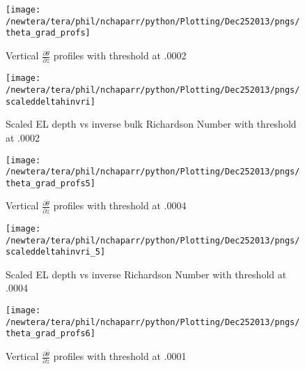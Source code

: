 \begin{figure}[htbp]
    \centering
    \texttt{[image: /newtera/tera/phil/nchaparr/python/Plotting/Dec252013/pngs/theta\_grad\_profs]}
    \caption{Vertical $\frac{\partial \overline{\theta}}{\partial z}$ profiles with threshold at .0002}
    \label{fig:thresh}   %
\end{figure}

\begin{figure}[htbp]
\centering
 \texttt{[image: /newtera/tera/phil/nchaparr/python/Plotting/Dec252013/pngs/scaleddeltahinvri]}
       
        \caption{Scaled EL depth vs inverse bulk Richardson Number with threshold at .0002}
         \label{fig:scaledeltahinvri}
\end{figure}

\begin{figure}[htbp]
    \centering
    \texttt{[image: /newtera/tera/phil/nchaparr/python/Plotting/Dec252013/pngs/theta\_grad\_profs5]}
    \caption{Vertical $\frac{\partial \overline{\theta}}{\partial z}$ profiles with threshold at .0004}
    \label{fig:thresh1}   %
\end{figure}

\begin{figure}[htbp]
    \centering
    \texttt{[image: /newtera/tera/phil/nchaparr/python/Plotting/Dec252013/pngs/scaleddeltahinvri\_5]}
    \caption{Scaled EL depth vs inverse Richardson Number with threshold at .0004}
    \label{fig:scaledeltahinvri1}   %
\end{figure}

\begin{figure}[htbp]
    \centering
    \texttt{[image: /newtera/tera/phil/nchaparr/python/Plotting/Dec252013/pngs/theta\_grad\_profs6]}
    \caption{Vertical $\frac{\partial \overline{\theta}}{\partial z}$ profiles with threshold at .0001}
    \label{fig:thresh2}   %
\end{figure}

